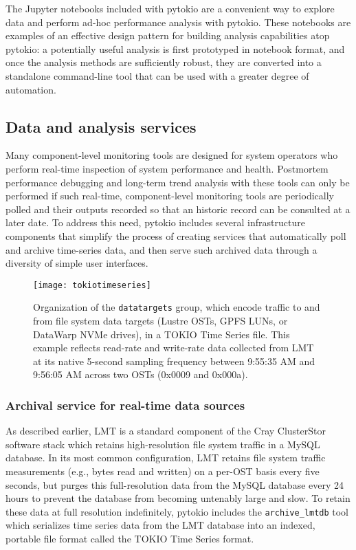 The Jupyter notebooks included with pytokio are a convenient way to explore data and perform ad-hoc performance analysis with pytokio.
These notebooks are examples of an effective design pattern for building analysis capabilities atop pytokio: a potentially useful analysis is first prototyped in notebook format, and once the analysis methods are sufficiently robust, they are converted into a standalone command-line tool that can be used with a greater degree of automation.

\subsection{Data and analysis services} \label{sec:apps/services}

Many component-level monitoring tools are designed for system operators who perform real-time inspection of system performance and health.
Postmortem performance debugging and long-term trend analysis with these tools can only be performed if such real-time, component-level monitoring tools are periodically polled and their outputs recorded so that an historic record can be consulted at a later date.
To address this need, pytokio includes several infrastructure components that simplify the process of creating services that automatically poll and archive time-series data, and then serve such archived data through a diversity of simple user interfaces.

\begin{figure}
    \centering
    \texttt{[image: tokiotimeseries]}
    \caption{Organization of the \texttt{datatargets} group, which encode traffic to and from file system data targets (Lustre OSTs, GPFS LUNs, or DataWarp NVMe drives), in a TOKIO Time Series file.
    This example reflects read-rate and write-rate data collected from LMT at its native 5-second sampling frequency between 9:55:35 AM and 9:56:05 AM across two OSTs (0x0009 and 0x000a).
    }
    \label{fig:tokiotimeseries}
    \vspace{-.2in}
\end{figure}

\subsubsection{Archival service for real-time data sources}

As described earlier, LMT is a standard component of the Cray ClusterStor software stack which retains high-resolution file system traffic in a MySQL database.
In its most common configuration, LMT retains file system traffic measurements (e.g., bytes read and written) on a per-OST basis every five seconds, but purges this full-resolution data from the MySQL database every 24 hours to prevent the database from becoming untenably large and slow.
To retain these data at full resolution indefinitely, pytokio includes the \texttt{archive\_lmtdb} tool which serializes time series data from the LMT database into an indexed, portable file format called the TOKIO Time Series format.

